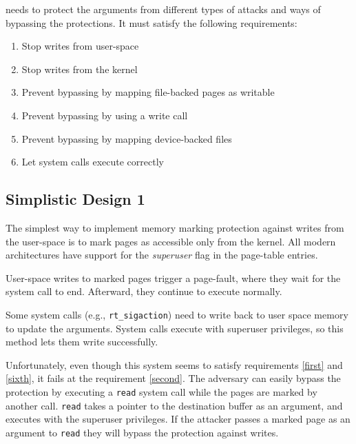 
\sysname needs to protect the arguments from different types of attacks and ways of
bypassing the protections. It must satisfy the following requirements:

\begin{enumerate}
  \item \label{first} Stop writes from user-space
  \item \label{second} Stop writes from the kernel
  \item \label{third} Prevent bypassing \sysname by mapping file-backed pages as writable
  \item \label{fourth} Prevent bypassing \sysname by using a write call
  \item \label{fifth} Prevent bypassing \sysname by mapping device-backed files
  \item \label{sixth} Let system calls execute correctly
\end{enumerate}

\subsection{Simplistic Design 1}
\label{simplistic1}
The simplest way to implement memory marking protection against writes from the
user-space is to mark pages as accessible only from the kernel. All modern 
architectures have support for the \emph{superuser} flag in the page-table
entries.

User-space writes to marked pages trigger a page-fault, where they wait for the
system call to end. Afterward, they continue to execute normally.

Some system calls (e.g., \texttt{rt\_sigaction}) need to write back to user
space memory to update the arguments. System calls execute with superuser
privileges, so this method lets them write successfully.


Unfortunately, even though this system seems to satisfy requirements \autoref{first} and 
\autoref{sixth}, it fails at the requirement \autoref{second}. The adversary can
easily bypass the protection by executing a \texttt{read} system call while the
pages are marked by another call. \texttt{read} takes a pointer to the destination
buffer as an argument, and executes with the superuser privileges. If the attacker
passes a marked page as an argument to \texttt{read} they will bypass the protection
against writes.

